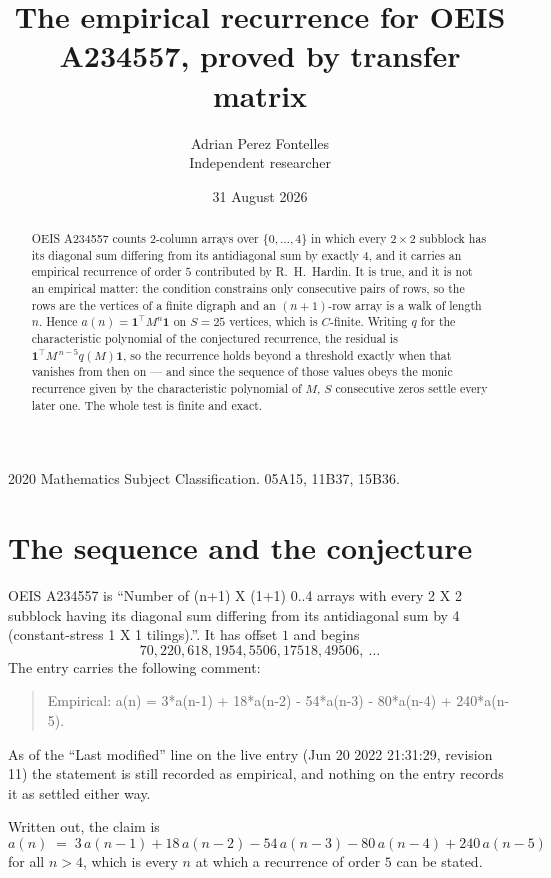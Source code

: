 \documentclass[11pt,a4paper]{article}
\title{The empirical recurrence for OEIS A234557, proved by transfer matrix}
\author{Adrian Perez Fontelles\\ \small Independent researcher}
\date{31 August 2026}
\theoremstyle{plain}
\theoremstyle{definition}
\begin{document}
\maketitle

\begin{abstract}
OEIS A234557 counts $2$-column arrays over $\{0,\dots,4\}$ in which every
$2\times2$ subblock has its diagonal sum differing from its antidiagonal sum by
exactly $4$, and it
carries an empirical recurrence of order $5$ contributed by R.~H.~Hardin. It is true,
and it is not an empirical matter: the condition constrains only consecutive pairs of rows,
so the rows are the vertices of a finite digraph and an $(n+1)$-row array is a walk of
length $n$. Hence $a(n)=\mathbf{1}^{\!\top}M^{n}\mathbf{1}$ on $S=25$ vertices, which
is $C$-finite. Writing $q$ for the characteristic polynomial of the conjectured recurrence,
the residual is $\mathbf{1}^{\!\top}M^{\,n-5}q(M)\mathbf{1}$, so the recurrence
holds beyond a threshold exactly when that vanishes from then on --- and since the sequence
of those values obeys the monic recurrence given by the characteristic polynomial of $M$,
$S$ consecutive zeros settle every later one. The whole test is finite and exact.
\end{abstract}

\noindent\small 2020 Mathematics Subject Classification. 05A15, 11B37, 15B36.\normalsize

\section{The sequence and the conjecture}

OEIS A234557 is ``Number of (n+1) X (1+1) 0..4 arrays with every 2 X 2 subblock having its diagonal sum differing from its antidiagonal sum by 4 (constant-stress 1 X 1 tilings).''. It has offset
$1$ and begins
\[
70, 220, 618, 1954, 5506, 17518, 49506,\ \dots
\]
The entry carries the following comment:
\begin{quote}\small
Empirical: a(n) = 3*a(n-1) + 18*a(n-2) - 54*a(n-3) - 80*a(n-4) + 240*a(n-5).
\end{quote}
As of the ``Last modified'' line on the live entry (Jun 20 2022 21:31:29, revision 11) the statement is
still recorded as empirical, and nothing on the entry records it as settled either way.

Written out, the claim is
\begin{equation}\label{eq:conj}
a(n)\;=\;3\,a(n-1) + 18\,a(n-2) - 54\,a(n-3) - 80\,a(n-4) + 240\,a(n-5)
\end{equation}
for all $n>4$, which is every $n$ at which a recurrence of order $5$ can be
stated.
\end{document}
